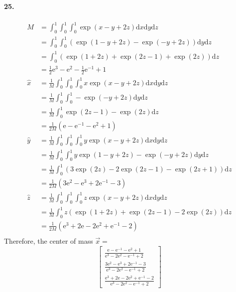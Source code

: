 \documentclass[11pt, a4paper]{article}
\begin{document}
\paragraph{25.}
$$\begin{aligned}
    M &= \int_{0}^{1}\int_{0}^{1}\int_{0}^{1} \exp(x - y + 2z) \mathrm{d}x\mathrm{d}y\mathrm{d}z \\
    &=\int_{0}^{1}\int_{0}^{1}(\exp(1-y+2z) - \exp(-y+2z))\mathrm{d}y\mathrm{d}z \\
    &=\int_{0}^{1}(\exp(1+2z)+\exp(2z-1)+\exp(2z))\mathrm{d}z \\
    &= \frac{1}{2}\mathrm{e}^3 - \mathrm{e}^2 - \frac{1}{2}\mathrm{e}^{-1} + 1 \\
    \hat{x} &= \frac{1}{M} \int_{0}^{1}\int_{0}^{1}\int_{0}^{1} x\exp(x-y+2z)\mathrm{d}x\mathrm{d}y\mathrm{d}z \\
    &= \frac{1}{M} \int_{0}^{1}\int_{0}^{1}-\exp(-y+2z)\mathrm{d}y\mathrm{d}z \\
    &= \frac{1}{M}\int_{0}^{1}\exp(2z-1)-\exp(2z) \mathrm{d}z \\
    &= \frac{1}{2M}(\mathrm{e} - \mathrm{e}^{-1} - \mathrm{e}^2 + 1) \\
    \hat{y} &= \frac{1}{M} \int_{0}^{1}\int_{0}^{1}\int_{0}^{1} y\exp(x-y+2z)\mathrm{d}x\mathrm{d}y\mathrm{d}z \\
    &= \frac{1}{M} \int_{0}^{1}\int_{0}^{1}y\exp(1-y+2z)-\exp(-y+2z)\mathrm{d}y\mathrm{d}z \\
    &= \frac{1}{M} \int_{0}^{1}(3\exp(2z)-2\exp(2z-1)-\exp(2z+1))\mathrm{d}z \\
    &= \frac{1}{2M}(3\mathrm{e}^2-\mathrm{e}^3+2\mathrm{e}^{-1}-3) \\
    \hat{z} &= \frac{1}{M} \int_{0}^{1}\int_{0}^{1}\int_{0}^{1} z\exp(x-y+2z)\mathrm{d}x\mathrm{d}y\mathrm{d}z \\
    &= \frac{1}{M} \int_{0}^{1} z(\exp(1+2z)+\exp(2z-1)-2\exp(2z))\mathrm{d}z \\
    &= \frac{1}{2M}(\mathrm{e}^3 + 2\mathrm{e} - 2\mathrm{e}^2+\mathrm{e}^{-1}-2) \\
\end{aligned}$$
Therefore, the center of mass $\vec{x} = $
$$\begin{bmatrix}
    \frac{\mathrm{e} - \mathrm{e}^{-1} - \mathrm{e}^2 + 1}{\mathrm{e}^3 - 2\mathrm{e}^2 - \mathrm{e}^{-1} + 2} \\
    \frac{3\mathrm{e}^2-\mathrm{e}^3+2\mathrm{e}^{-1}-3}{\mathrm{e}^3 - 2\mathrm{e}^2 - \mathrm{e}^{-1} + 2} \\
    \frac{\mathrm{e}^3 + 2\mathrm{e} - 2\mathrm{e}^2+\mathrm{e}^{-1}-2}{\mathrm{e}^3 - 2\mathrm{e}^2 - \mathrm{e}^{-1} + 2}
\end{bmatrix}$$
\end{document}
